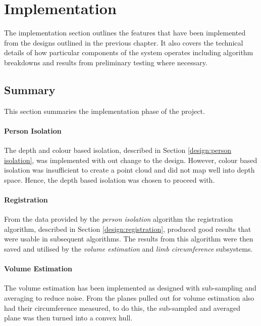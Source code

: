 \chapter{Implementation}
\label{implementation}

The implementation section outlines the features that have been implemented from the designs outlined in the previous chapter. It also covers the technical details of how particular components of the system operates including algorithm breakdowns and results from preliminary testing where necessary. \\



%
%








\newpage
\section{Summary}
This section summaries the implementation phase of the project.\\

\subsubsection{Person Isolation}
The depth and colour based isolation, described in Section \ref{design:person isolation}, was implemented with out change to the design. However, colour based isolation was insufficient to create a point cloud and did not map well into depth space. Hence, the depth based isolation was chosen to proceed with.\\

\subsubsection{Registration}
From the data provided by the \emph{person isolation} algorithm the registration algorithm, described in Section \ref{design:registration}, produced good results that were usable in subsequent algorithms. The results from this algorithm were then saved and utilised by the \emph{volume estimation} and \emph{limb circumference} subsystems. 

\subsubsection{Volume Estimation}
The volume estimation has been implemented as designed with sub-sampling and averaging to reduce noise. From the planes pulled out for volume estimation also had their circumference measured, to do this, the sub-sampled and averaged plane was then turned into a convex hull.\\ 
 
